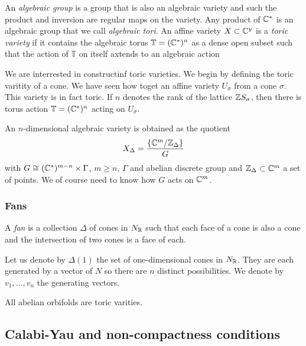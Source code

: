             An \emph{algebraic group} is a group that is also an algebraic variety and such the product and inversion are regular maps on the variety. Any product of $\mathbb{C}^*$ is an algebraic group that we call \emph{algebraic tori}. An affine variety $X\subset\mathbb{C}^y$ is a \emph{toric variety} if it contains the algebraic torus $\mathbb{T}=(\mathbb{C}^*)^n$ as a dense open subset such that the action of $\mathbb{T}$ on itself axtends to an algebraic action
            
            We are interrested in constructinf toric varieties. We begin by defining the toric varitity of a cone. We have seen how toget an affine variety $U_\sigma$ from a cone $\sigma$. This variety is in fact toric. If $n$ denotes the rank of the lattice $\mathbb{Z} S_\sigma$, then there is torus action $\mathbb{T}=(\mathbb{C}^*)^n$ acting on $U_\sigma$.
            
            An $n$-dimensional algebraic variety is obtained as the quotient
            \begin{equation}
                X_\Delta=\frac{\{\mathbb{C}^m/\mathbb{Z}_\Delta\}}{G}
            \end{equation}
            with $G\cong (\mathbb{C}^*)^{m-n}\times\Gamma$, $m\geq n$, $\Gamma$ and abelian discrete group and $\mathbb{Z}_\Delta\subset\mathbb{C}^m$ a set of points. We of course need to know how $G$ acts on $\mathbb{C}^m$.

        \subsubsection{Fans}
            
            A \emph{fan} is a collection $\Delta$ of cones in $N_{\mathbb{R}}$ such that each face of a cone is also a cone and the intersection of two cones is a face of each.

            Let us denote by $\Delta(1)$ the set of one-dimensional cones in $N_{\mathbb{R}}$. They are each generated by a vector of $N$ so there are $n$ distinct possibilities. We denote by $v_1,\dots,v_n$ the generating vectors.
            
            \begin{prop*}
                All abelian orbifolds are toric varities.
            \end{prop*}

        

    \subsection{Calabi-Yau and non-compactness conditions}

